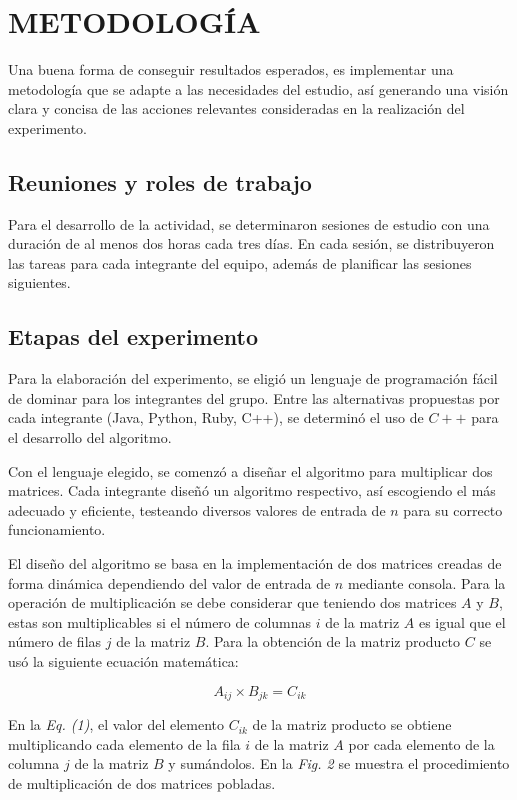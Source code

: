 \documentclass[11pt, twocolumn]{llncs}
\begin{document}
\section{METODOLOGÍA}\label{metodología}
Una buena forma de conseguir resultados esperados, es implementar una metodología que se adapte a las necesidades del estudio, así generando una visión clara y concisa de las acciones relevantes consideradas en la realización del experimento.

\subsection{Reuniones y roles de trabajo}
Para el desarrollo de la actividad, se determinaron sesiones de estudio con una duración de al menos dos horas cada tres días. En cada sesión, se distribuyeron las tareas para cada integrante del equipo, además de planificar las sesiones siguientes.

\subsection{Etapas del experimento}
Para la elaboración del experimento, se eligió un lenguaje de programación fácil de dominar para los integrantes del grupo. Entre las alternativas propuestas por cada integrante (Java, Python, Ruby, C++), se determinó el uso de $C++$ para el desarrollo del algoritmo.

Con el lenguaje elegido, se comenzó a diseñar el algoritmo para multiplicar dos matrices. Cada integrante diseñó un algoritmo respectivo, así escogiendo el más adecuado y eficiente, testeando diversos valores de entrada de $n$ para su correcto funcionamiento.

El diseño del algoritmo se basa en la implementación de dos matrices creadas de forma dinámica dependiendo del valor de entrada de $n$ mediante consola. Para la operación de multiplicación se debe considerar que teniendo dos matrices $A$ y $B$, estas son multiplicables si el número de columnas $i$ de la matriz $A$ es igual que el número de filas $j$ de la matriz $B$. Para la obtención de la matriz producto $C$ se usó la siguiente ecuación matemática:

\begin{equation}
A_{ij} \times B_{jk} = C_{ik}
\end{equation}

En la \textit{Eq. (1)}, el valor del elemento $C_{ik}$ de la matriz producto se obtiene multiplicando cada elemento de la fila $i$ de la matriz $A$ por cada elemento de la columna $j$ de la matriz $B$ y sumándolos. En la \textit{Fig. 2} se muestra el procedimiento de multiplicación de dos matrices pobladas.
\end{document}
